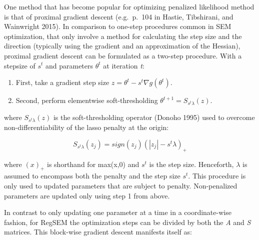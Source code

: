 \documentclass[article]{jss}
\begin{document}
One method that has become popular for optimizing penalized likelihood
method is that of proximal gradient descent (e.g.~p.~104 in Hastie,
Tibshirani, and Wainwright 2015). In comparison to one-step procedures
common in SEM optimization, that only involve a method for calculating
the step size and the direction (typically using the gradient and an
approximation of the Hessian), proximal gradient descent can be
formulated as a two-step procedure. With a stepsize of \(s^{t}\) and
parameters \(\theta^{t}\) at iteration \textit{t}:

\begin{enumerate}
    \item First, take a gradient step size $z = \theta^{t} - s^{t} \nabla g(\theta^{t})$.
    \item Second, perform elementwise soft-thresholding $\theta^{t+1} = S_{s^{t} \lambda}(z)$.
\end{enumerate}

where \(S_{s^{t} \lambda}(z)\) is the soft-thresholding operator (Donoho
1995) used to overcome non-differentiability of the lasso penalty at the
origin:

\begin{equation}
S_{s^{t} \lambda}(z_{j}) = sign(z_{j})(|z_{j}|-s^{t} \lambda)_{+}
\end{equation}

\noindent
where \((x)_{+}\) is shorthand for max(x,0) and \(s^{t}\) is the step
size. Henceforth, \(\lambda\) is assumed to encompass both the penalty
and the step size \(s^{t}\). This procedure is only used to updated
parameters that are subject to penalty. Non-penalized parameters are
updated only using step 1 from above.

In contrast to only updating one parameter at a time in a
coordinate-wise fashion, for RegSEM the optimization steps can be
divided by both the \textit{A} and \textit{S} matrices. This block-wise
gradient descent manifests itself as:

\noindent
\end{document}

